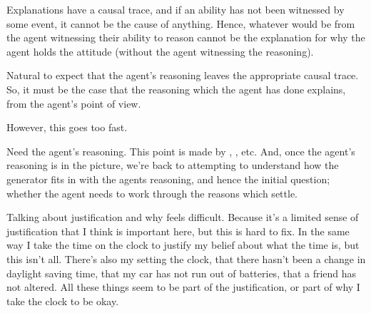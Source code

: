 \documentclass[10pt]{article}
\begin{document}
\begin{note}
  Explanations have a causal trace, and if an ability has not been witnessed by some event, it cannot be the cause of anything.
  Hence, whatever would be from the agent witnessing their ability to reason cannot be the explanation for why the agent holds the attitude (without the agent witnessing the reasoning).

  Natural to expect that the agent's reasoning leaves the appropriate causal trace.
  So, it must be the case that the reasoning which the agent has done explains, from the agent's point of view.

  However, this goes too fast.

  Need the agent's reasoning.
  This point is made by \citeauthor[233]{Davidson:2001aa}, \citeauthor{Hieronymi:2018aa}, etc.
  And, once the agent's reasoning is in the picture, we're back to attempting to understand how the generator fits in with the agents reasoning, and hence the initial question; whether the agent needs to work through the reasons which settle.
\end{note}





\begin{note}
  Talking about justification and why feels difficult.
  Because it's a limited sense of justification that I think is important here, but this is hard to fix.
  In the same way I take the time on the clock to justify my belief about what the time is, but this isn't all.
  There's also my setting the clock, that there hasn't been a change in daylight saving time, that my car has not run out of batteries, that a friend has not altered.
  All these things seem to be part of the justification, or part of why I take the clock to be okay.
  
\end{note}
\end{document}
